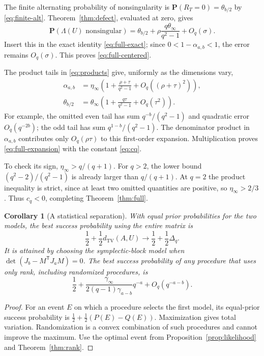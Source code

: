 \documentclass[11pt,letterpaper]{article}
\newtheorem{corollary}[theorem]{Corollary}
\theoremstyle{remark}
\newcommand{\Prob}{\mathbf P}
\newcommand{\TV}{d_{\mathrm{TV}}}
\begin{document}
The finite alternating probability of nonsingularity is
$\Prob(R_T=0)=\theta_{b/2}$ by \eqref{eq:finite-alt}.
Theorem~\ref{thm:defect}, evaluated at zero, gives
\[
 \Prob(\Lambda(U)\text{ nonsingular})
    =\theta_{b/2}+\rho\frac{q\theta_\infty}{q^2-1}
       +O_q(\sigma).
\]
Insert this in the exact identity \eqref{eq:full-exact}; since
$0<1-\alpha_{a,b}<1$, the error remains $O_q(\sigma)$.
This proves \eqref{eq:full-centered}.

The product tails in \eqref{eq:products} give, uniformly as the dimensions
vary,
\begin{align*}
 \alpha_{a,b}
   &=\eta_\infty\left(1+\frac{\rho+\tau}{q^2-1}
                 +O_q((\rho+\tau)^2)\right),\\
 \theta_{b/2}
   &=\theta_\infty\left(1+\frac{q\tau}{q^2-1}
                    +O_q(\tau^2)\right).
\end{align*}
For example, the omitted even tail has sum $q^{-b}/(q^2-1)$ and
quadratic error $O_q(q^{-2b})$; the odd tail has sum
$q^{1-b}/(q^2-1)$. The denominator product in $\alpha_{a,b}$ contributes
only $O_q(\rho\tau)$ to this first-order expansion.
Multiplication proves \eqref{eq:full-expansion} with the constant
\eqref{eq:cq}.

To check its sign, $\eta_\infty>q/(q+1)$.
For $q>2$, the lower bound $(q^2-2)/(q^2-1)$ is already larger than
$q/(q+1)$. At $q=2$ the product inequality is strict, since at least
two omitted quantities are positive, so $\eta_\infty>2/3$.
Thus $c_q<0$, completing Theorem~\ref{thm:full}.

\begin{corollary}[A statistical separation]\label{cor:testing}
With equal prior probabilities for the two models, the best success
probability using the entire matrix is
\[
 \frac12+\frac12\TV(A,U)
       \longrightarrow \frac12+\frac12\Delta_q.
\]
It is attained by choosing the symplectic-block model when
$\det(J_b-M^{\mathsf T}J_aM)=0$.
The best success probability of any procedure that uses only rank,
including randomized procedures, is
\[
 \frac12+
 \frac{\gamma_\infty}{2(q-1)\gamma_{a-b}}q^{-a}
       +O_q(q^{-a-b}).
\]
\end{corollary}

\begin{proof}
For an event $E$ on which a procedure selects the first model, its equal-prior
success probability is $\tfrac12+\tfrac12(P(E)-Q(E))$.
Maximization gives total variation. Randomization is a convex combination
of such procedures and cannot improve the maximum. Use the optimal event
from Proposition~\ref{prop:likelihood} and Theorem~\ref{thm:rank}.
\end{proof}
\end{document}
